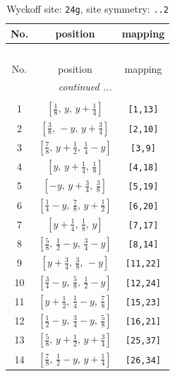 \documentclass[fleqn,8pt]{jsarticle}
\begin{document}
\renewcommand{\arraystretch}{1.2}
\begin{longtable}{ccc}
\caption{Wyckoff site: {\tt 24g}, site symmetry: {\tt ..2}}
 \\
 \hline \hline
No. & position & mapping \\ \hline \endfirsthead

\multicolumn{2}{l}{\tablename\ \thetable{}} \\
 \hline \hline
No. & position & mapping \\ \hline \endhead

 \hline \hline
\multicolumn{2}{r}{\footnotesize\it continued ...} \\ \endfoot

 \hline \hline
\multicolumn{2}{r}{} \\ \endlastfoot

1 & $\left[ \frac{1}{8},\, y,\, y + \frac{1}{4} \right]$ & {\tt [1,13]} \\ \hline
2 & $\left[ \frac{3}{8},\, - y,\, y + \frac{3}{4} \right]$ & {\tt [2,10]} \\ \hline
3 & $\left[ \frac{7}{8},\, y + \frac{1}{2},\, \frac{1}{4} - y \right]$ & {\tt [3,9]} \\ \hline
4 & $\left[ y,\, y + \frac{1}{4},\, \frac{1}{8} \right]$ & {\tt [4,18]} \\ \hline
5 & $\left[ - y,\, y + \frac{3}{4},\, \frac{3}{8} \right]$ & {\tt [5,19]} \\ \hline
6 & $\left[ \frac{1}{4} - y,\, \frac{7}{8},\, y + \frac{1}{2} \right]$ & {\tt [6,20]} \\ \hline
7 & $\left[ y + \frac{1}{4},\, \frac{1}{8},\, y \right]$ & {\tt [7,17]} \\ \hline
8 & $\left[ \frac{5}{8},\, \frac{1}{2} - y,\, \frac{3}{4} - y \right]$ & {\tt [8,14]} \\ \hline
9 & $\left[ y + \frac{3}{4},\, \frac{3}{8},\, - y \right]$ & {\tt [11,22]} \\ \hline
10 & $\left[ \frac{3}{4} - y,\, \frac{5}{8},\, \frac{1}{2} - y \right]$ & {\tt [12,24]} \\ \hline
11 & $\left[ y + \frac{1}{2},\, \frac{1}{4} - y,\, \frac{7}{8} \right]$ & {\tt [15,23]} \\ \hline
12 & $\left[ \frac{1}{2} - y,\, \frac{3}{4} - y,\, \frac{5}{8} \right]$ & {\tt [16,21]} \\ \hline
13 & $\left[ \frac{5}{8},\, y + \frac{1}{2},\, y + \frac{3}{4} \right]$ & {\tt [25,37]} \\ \hline
14 & $\left[ \frac{7}{8},\, \frac{1}{2} - y,\, y + \frac{1}{4} \right]$ & {\tt [26,34]} \\ \hline

\end{longtable}
\end{document}
